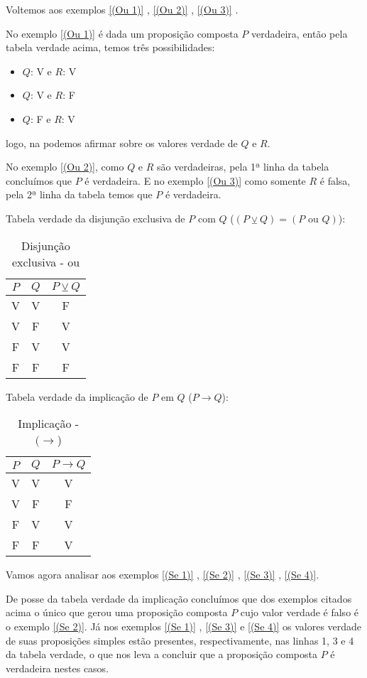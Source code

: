  \begin{exem}
  Voltemos aos exemplos \ref{(Ou 1)} , \ref{(Ou 2)} , \ref{(Ou 3)} .
  
  No exemplo \ref{(Ou 1)} é dada um proposição composta $P$ verdadeira, então pela tabela verdade acima, temos três possibilidades:
  \begin{itemize}
   \item $Q$: V e $R$: V
   \item $Q$: V e $R$: F
   \item $Q$: F e $R$: V
  \end{itemize}
  logo, na podemos afirmar sobre os valores verdade de $Q$ e $R$.
  
  No exemplo \ref{(Ou 2)}, como $Q$ e $R$ são verdadeiras, pela 1ª linha da tabela concluímos que $P$ é verdadeira. E no exemplo \ref{(Ou 3)} como somente $R$ é falsa, pela 2ª linha da tabela temos que $P$ é verdadeira. 

 \end{exem}
 
 Tabela verdade da disjunção exclusiva de $P$ com $Q$ ($(P \veebar Q)= (P \text{ ou } Q)$): 
 \begin{table}[H]
 \centering
 \begin{tabular}{|c|c|c|} \hline
 \rowcolor{cinza}
 $P$ & $Q$ & $P \veebar Q$ \\ \hline
 V & V & F \\ \hline
 V & F & V \\ \hline
 F & V & V \\ \hline
 F & F & F \\ \hline
 \end{tabular}
 \caption{Disjunção exclusiva - ou}
\end{table}

 
 Tabela verdade da implicação de $P$ em $Q$ ($P \rightarrow Q $): 
 \begin{table}[H]
 \centering
 \begin{tabular}{|c|c|c|} \hline
 \rowcolor{cinza}
 $P$ & $Q$ & $P \rightarrow Q$ \\ \hline
 V & V & V \\ \hline
 V & F & F \\ \hline
 F & V & V \\ \hline
 F & F & V \\ \hline
 \end{tabular}
 \caption{Implicação - $(\rightarrow$)}
\end{table}
 
 \begin{exem}
  Vamos agora analisar aos exemplos \ref{(Se 1)} , \ref{(Se 2)} , \ref{(Se 3)} , \ref{(Se 4)}.
  
  De posse da tabela verdade da implicação concluímos que dos exemplos citados acima o único que gerou uma proposição composta $P$ cujo valor verdade é falso é o exemplo \ref{(Se 2)}. Já nos exemplos \ref{(Se 1)} , \ref{(Se 3)} e \ref{(Se 4)} os valores verdade de suas proposições simples estão presentes, respectivamente, nas linhas 1, 3 e 4 da tabela verdade, o que nos leva a concluir que a proposição composta $P$ é verdadeira nestes casos.
  
  \end{exem}
 
